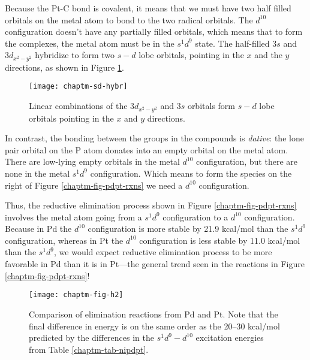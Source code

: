 Because the Pt-C bond is covalent, it means that we must have two
half filled orbitals on the metal atom to bond to the two 
radical orbitals. The $d^{10}$ configuration doesn't have any partially
filled orbitals, which means that to form the 
complexes, the metal atom must be in the $s^1d^9$ state.
The half-filled $3s$ and $3d_{x^2-y^2}$ hybridize to form two $s-d$ lobe
orbitals, pointing in the $x$ and the $y$ directions, as shown in
Figure \ref{chaptm-sd-hybr}.

\begin{figure}
\begin{center}
\texttt{[image: chaptm-sd-hybr]}
\end{center}
\caption{Linear combinations of the $3d_{x^2-y^2}$ and $3s$ orbitals
  form $s-d$ lobe orbitals pointing in the $x$ and $y$ directions.}
\label{chaptm-sd-hybr}
\end{figure}

In contrast, the bonding between the  groups in the
 compounds is \emph{dative}: the lone pair orbital on
the P atom donates into an empty orbital on the metal atom. There are
low-lying empty orbitals in the metal $d^{10}$ configuration, but
there are none in the metal $s^1d^9$ configuration. Which means to
form the  species on the right of Figure
\ref{chaptm-fig-pdpt-rxns} we need a $d^{10}$ configuration.

Thus, the reductive elimination process shown in Figure
\ref{chaptm-fig-pdpt-rxns} involves the metal atom going from a
$s^1d^9$ configuration to a $d^{10}$ configuration. Because in Pd the
$d^{10}$ configuration is more stable by 21.9 kcal/mol than the
$s^1d^9$ configuration, whereas in Pt the $d^{10}$ configuration is
less stable by 11.0 kcal/mol than the $s^1d^9$, we would expect
reductive elimination process to be more favorable in Pd than it is in
Pt---the general trend seen in the reactions in Figure
\ref{chaptm-fig-pdpt-rxns}!

\begin{figure}
\begin{center}
\texttt{[image: chaptm-fig-h2]}
\end{center}
\caption{Comparison of  elimination reactions from Pd and
  Pt. Note that the final difference in energy is on the same order as
  the 20--30 kcal/mol predicted by the differences in the
  $s^1d^9-d^{10}$ excitation energies from Table
  \ref{chaptm-tab-nipdpt}.}
\label{chaptm-fig-h2}
\end{figure}

